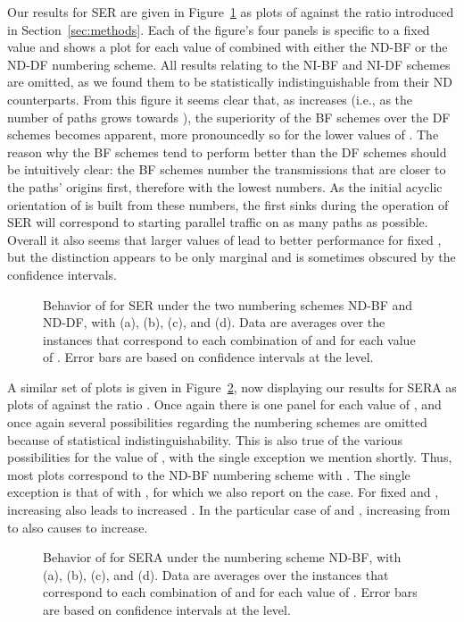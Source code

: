 \documentclass{article}
\begin{document}
Our results for SER are given in Figure~\ref{fig9} as plots of 
against the  ratio introduced in Section~\ref{sec:methods}. Each of the
figure's four panels is specific to a fixed  value and shows a plot for
each value of  combined with either the ND-BF or the ND-DF numbering scheme.
All results relating to the NI-BF and NI-DF schemes are omitted, as we found
them to be statistically indistinguishable from their ND counterparts. From this
figure it seems clear that, as  increases (i.e., as the number of paths 
grows towards ), the superiority of the BF schemes over the DF schemes
becomes apparent, more pronouncedly so for the lower values of . The
reason why the BF schemes tend to perform better than the DF schemes should be
intuitively clear: the BF schemes number the transmissions that are closer to
the paths' origins first, therefore with the lowest numbers. As the initial
acyclic orientation of  is built from these numbers, the first sinks during
the operation of SER will correspond to starting parallel traffic on as many
paths as possible. Overall it also seems that larger values of  lead to
better performance for fixed , but the distinction appears to be only
marginal and is sometimes obscured by the confidence intervals.

\begin{figure}[p]
\centering
{}
\caption{Behavior of  for SER under the two numbering schemes
ND-BF and ND-DF, with  (a),  (b),  (c), and
 (d). Data are averages over the   instances that correspond
to each combination of  and  for each value of . Error bars are
based on confidence intervals at the  level.}
\label{fig9}
\end{figure}

A similar set of plots is given in Figure~\ref{fig10}, now displaying our
results for SERA as plots of  against the ratio . Once
again there is one panel for each value of , and once again several
possibilities regarding the numbering schemes are omitted because of statistical
indistinguishability. This is also true of the various possibilities for the
value of , with the single exception we mention shortly. Thus, most plots
correspond to the ND-BF numbering scheme with . The single exception is
that of  with , for which we also report on the  case. For
fixed  and , increasing  also leads to increased
. In the particular case of  and , increasing
 from  to  also causes  to increase.

\begin{figure}[p]
\centering
{}
\caption{Behavior of  for SERA under the numbering scheme
ND-BF, with  (a),  (b),  (c), and 
(d). Data are averages over the   instances that correspond to each
combination of  and  for each value of . Error bars are based on
confidence intervals at the  level.}
\label{fig10}
\end{figure}
\end{document}

